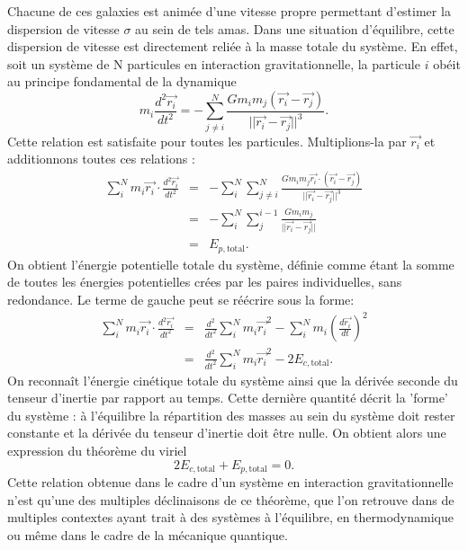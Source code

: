 Chacune de ces galaxies est animée d'une vitesse propre permettant d'estimer la dispersion de vitesse $\sigma$ au sein de tels amas. Dans une situation d'équilibre, cette dispersion de vitesse est directement reliée à la masse totale du système. En effet, soit un système de N particules en interaction gravitationnelle, la particule $i$ obéit au principe fondamental de la dynamique
\begin{equation}
m_i\frac{d^2 \vec{r_i}}{dt^2}=-\sum_{j\neq i}^N \frac{Gm_i m_j (\vec{r_i}-\vec{r_j})}{||\vec{r_i}-\vec{r_j}||^3}.
\end{equation}
Cette relation est satisfaite pour toutes les particules. Multiplions-la par $\vec{r_i}$ et additionnons toutes ces relations :
\begin{eqnarray}
\sum_i^N m_i\vec{r_i}\cdot\frac{d^2 \vec{r_i}}{dt^2}&=&-\sum_i^N \sum_{j\neq i}^N \frac{Gm_i m_j \vec{r_i}\cdot (\vec{r_i}-\vec{r_j})}{||\vec{r_i}-\vec{r_j}||^3}\\
&=& -\sum_i^N \sum_j^{i-1}\frac{Gm_i m_j}{||\vec{r_i}-\vec{r_j}||}\\
&=&E_{p,\mathrm{total}}.
\end{eqnarray}
On obtient l'énergie potentielle totale du système, définie comme étant la somme de toutes les énergies potentielles crées par les paires individuelles, sans redondance. Le terme de gauche peut se réécrire sous la forme:
\begin{eqnarray}
\sum_i^N m_i\vec{r_i}\cdot\frac{d^2 \vec{r_i}}{dt^2}&=&\frac{d^2}{dt^2}\sum_i^N m_i \vec{r_i}^2 - \sum_i^N m_i \left(\frac{d \vec{r_i}}{dt}\right)^2\\
&=&\frac{d^2}{dt^2}\sum_i^N m_i \vec{r_i}^2 - 2E_{c,\mathrm{total}}.
\end{eqnarray}
On reconnaît l'énergie cinétique totale du système ainsi que la dérivée seconde du tenseur d'inertie par rapport au temps. Cette dernière quantité décrit la 'forme' du système : à l'équilibre la répartition des masses au sein du système doit rester constante et la dérivée du tenseur d'inertie doit être nulle. On obtient alors une expression du théorème du viriel
\begin{equation}
2E_{c,\mathrm{total}} + E_{p,\mathrm{total}} =0.
\end{equation}
Cette relation obtenue dans le cadre d'un système en interaction gravitationnelle n'est qu'une des multiples déclinaisons de ce théorème, que l'on retrouve dans de multiples contextes ayant trait à des systèmes à l'équilibre, en thermodynamique ou même dans le cadre de la mécanique quantique.

